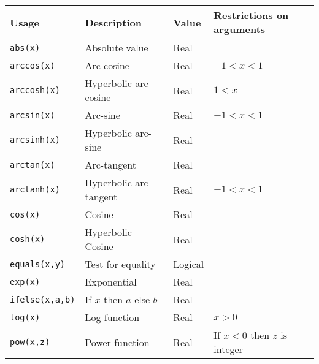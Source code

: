 \documentclass[11pt, a4paper, titlepage]{report}
\begin{document}
\begin{table}[h!]
\begin{center}
\begin{tabular}{llll}
\hline
Usage  & Description & Value & Restrictions on arguments \\ 
\hline
\verb+abs(x)+       & Absolute value        & Real & \\
\verb+arccos(x)+    & Arc-cosine            & Real & $-1 < x < 1$\\
\verb+arccosh(x)+   & Hyperbolic arc-cosine & Real & $1 < x$ \\
\verb+arcsin(x)+    & Arc-sine              & Real & $-1 < x < 1$\\
\verb+arcsinh(x)+   & Hyperbolic arc-sine   & Real &\\
\verb+arctan(x)+    & Arc-tangent           & Real &\\
\verb+arctanh(x)+   & Hyperbolic arc-tangent & Real & $-1 < x < 1$\\
\verb+cos(x)+       & Cosine              & Real & \\
\verb+cosh(x)+      & Hyperbolic Cosine   & Real & \\
\verb+equals(x,y)+   & Test for equality   & Logical & \\
\verb+exp(x)+       & Exponential         & Real & \\
\verb+ifelse(x,a,b)+ & If $x$ then $a$ else $b$ & Real & \\
\verb+log(x)+       & Log function        & Real & $x > 0$ \\
\verb+pow(x,z)+     & Power function      & Real & If $x < 0$ then $z$ is integer \\ 

\end{tabular}
\end{center}
\end{table}
\end{document}
